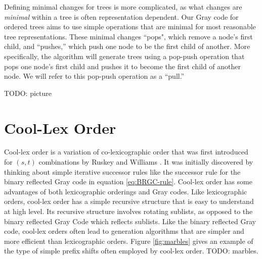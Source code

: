 
Defining minimal changes for trees is more complicated, as what changes are \emph{minimal} within a tree is often representation dependent.  Our Gray code for ordered trees aims to use simple operations that are minimal for most reasonable tree representations.  These minimal changes ``pops", which remove a node's first child, and ``pushes,'' which push one node to be the first child of another.  More specifically, the algorithm will generate trees using a pop-push operation that pops one node's first child and pushes it to become the first child of another node.  We will refer to this pop-push operation as a ``pull.''

TODO: picture

\section{Cool-Lex Order}

Cool-lex order is a variation of co-lexicographic order that was first introduced for $(s,t)$ combinations by Ruskey and Williams \cite{ruskey2005generating} \cite{ruskey2008generating}.  It was initially discovered by thinking about simple iterative successor rules like the successor rule for the binary reflected Gray code in equation \ref{eq:BRGC-rule}. Cool-lex order has some advantages of both lexicographic orderings and Gray codes.  Like lexicographic orders, cool-lex order has a simple recursive structure that is easy to understand at  high level.  Its recursive structure involves rotating sublists, as opposed to the binary reflected Gray Code which reflects sublists.  Like the binary reflected Gray code, cool-lex orders often lead to generation algorithms that are simpler and more efficient than lexicographic orders.   Figure \ref{fig:marbles} gives an example of the type of simple prefix shifts often employed by cool-lex order.
TODO: marbles.


